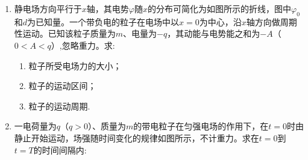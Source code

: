 \begin{enumerate}[leftmargin=0em]
{\begin{enumerate}
\end{enumerate}
}


\newpage
\item
{}
静电场方向平行于$ x $轴，其电势$ \varphi $随$ x $的分布可简化为如图所示的折线，图中$ \varphi_{0} $和$ d $为已知量。一个带负电的粒子在电场中以$ x=0 $为中心，沿$ x $轴方向做周期性运动。已知该粒子质量为$ m $、电量为$ -q $，其动能与电势能之和为$ -A $（$ 0<A<q $）,忽略重力。求:
\begin{enumerate}
\renewcommand{\labelenumi}{\arabic{enumi}.}
\item
粒子所受电场力的大小；
\item 
粒子的运动区间；
\item 
粒子的运动周期.



\end{enumerate}
\begin{figure}[h!]
\flushright

\end{figure}








\newpage
\item
{}
一电荷量为$ q $（$ q>0 $）、质量为$ m $的带电粒子在匀强电场的作用下，在$ t=0 $时由静止开始运动，场强随时间变化的规律如图所示，不计重力。求在$ t=0 $到$ t=T $的时间间隔内:
\begin{enumerate}
\renewcommand{\labelenumii}{(\arabic{enumii})}


\end{enumerate}
\end{enumerate}
